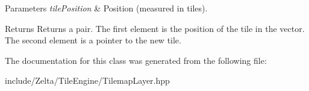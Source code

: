 \begin{DoxyParams}{Parameters}
{\em tile\+Position} & Position (measured in tiles). \\
\hline
\end{DoxyParams}
\begin{DoxyReturn}{Returns}
Returns a pair. The first element is the position of the tile in the vector. The second element is a pointer to the new tile. 
\end{DoxyReturn}


The documentation for this class was generated from the following file\+:\begin{DoxyCompactItemize}
\item 
include/\+Zelta/\+Tile\+Engine/Tilemap\+Layer.\+hpp\end{DoxyCompactItemize}

